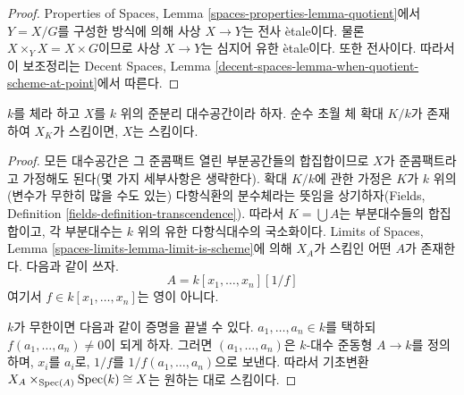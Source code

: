 \begin{proof}
Properties of Spaces, Lemma \ref{spaces-properties-lemma-quotient}에서
$Y = X/G$를 구성한 방식에 의해 사상 $X \to Y$는 전사 \`etale이다.
물론 $X \times_Y X = X \times G$이므로 사상 $X \to Y$는 심지어 유한
\`etale이다. 또한 전사이다. 따라서 이 보조정리는 Decent Spaces,
Lemma \ref{decent-spaces-lemma-when-quotient-scheme-at-point}에서 따른다.
\end{proof}

\begin{lemma}
\label{lemma-scheme-after-purely-transcendental-base-change}
$k$를 체라 하고 $X$를 $k$ 위의 준분리 대수공간이라 하자. 순수 초월
체 확대 $K/k$가 존재하여 $X_K$가 스킴이면, $X$는 스킴이다.
\end{lemma}

\begin{proof}
모든 대수공간은 그 준콤팩트 열린 부분공간들의 합집합이므로 $X$가
준콤팩트라고 가정해도 된다(몇 가지 세부사항은 생략한다). 확대 $K/k$에
관한 가정은 $K$가 $k$ 위의 (변수가 무한히 많을 수도 있는) 다항식환의
분수체라는 뜻임을 상기하자(Fields, Definition
\ref{fields-definition-transcendence}). 따라서 $K = \bigcup A$는
부분대수들의 합집합이고, 각 부분대수는 $k$ 위의 유한 다항식대수의
국소화이다. Limits of Spaces, Lemma
\ref{spaces-limits-lemma-limit-is-scheme}에 의해 $X_A$가 스킴인 어떤
$A$가 존재한다. 다음과 같이 쓰자.
$$
A = k[x_1, \ldots, x_n][1/f]
$$
여기서 $f \in k[x_1, \ldots, x_n]$는 영이 아니다.

\medskip\noindent
$k$가 무한이면 다음과 같이 증명을 끝낼 수 있다.
$a_1, \ldots, a_n \in k$를 택하되
$f(a_1, \ldots, a_n) \not = 0$이 되게 하자.
그러면 $(a_1, \ldots, a_n)$은 $k$-대수 준동형 $A \to k$를 정의하며,
$x_i$를 $a_i$로, $1/f$를 $1/f(a_1, \ldots, a_n)$으로 보낸다. 따라서
기초변환 $X_A \times_{\mathop{\mathrm{Spec}}(A)} \mathop{\mathrm{Spec}}(k) \cong X$는 원하는 대로
스킴이다.


\end{proof}
